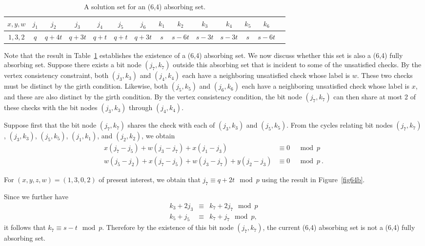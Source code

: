 \hspace{-0.2in}\small{\hspace{-0.2in}\begin{table}[ht]\vspace{-0.05in}\hspace{-0.2in}
\begin{tabular}{|c |c|c|c|c|c|c|c|c|c|c|c|c|c|}
  \hline
  $x,y,w$ & $j_1$ & $j_2$ & $j_3$ & $j_4$ & $j_5$ & $j_6$ & $k_1$ & $k_2$ & $k_3$ & $k_4$ & $k_5$ & $k_6$ \\
  \hline
$1,3,2$&  $q$ & $q+4t$ &  $q+3t$ &  $q+t$ &  $q+t$ & $q+3t$ & $s$ &
$s-6t$ & $s-3t$ & $s-3t$ & $s$ &
  $s-6t$\\
  \hline
\end{tabular}
\caption{ A solution set for an (6,4) absorbing
set.}\label{table64b}
\end{table}}
\normalsize

Note that the result in Table~\ref{table64b} establishes the
existence of a (6,4) absorbing set. We now discuss whether this
set is also a (6,4) fully absorbing set. Suppose there exists a
bit node $(j_7,k_7)$ outside this absorbing set that is incident
to some of the unsatisfied checks. By the vertex consistency
constraint, both $(j_3,k_3)$ and $(j_4,k_4)$ each have a
neighboring unsatisfied check whose label is $w$. These two checks
must be distinct by the girth condition. Likewise, both
$(j_5,k_5)$ and $(j_6,k_6)$ each have a neighboring unsatisfied
check whose label is $x$, and these are also distinct by the girth
condition. By the vertex consistency condition, the bit node
$(j_7,k_7)$ can then share at most 2 of these checks with the bit
nodes $(j_3,k_3)$ through $(j_4,k_4)$.

Suppose first that the bit node $(j_7,k_7)$ shares the check with
each of $(j_3,k_3)$ and $(j_5,k_5)$. From the cycles relating bit
nodes $(j_7,k_7)$, $(j_3,k_3)$, $(j_5,k_5)$, $(j_1,k_1)$, and
$(j_2,k_2)$, we obtain
\begin{eqnarray*}
x(j_7-j_5)+w(j_3-j_7)+x(j_1-j_3) &\equiv 0& \mod p\\
w(j_5-j_2)+x(j_7-j_5)+w(j_3-j_7)+y(j_2-j_3) &\equiv 0& \mod p~.
\end{eqnarray*}

For $(x,y,z,w)=(1,3,0,2)$ of present interest, we obtain that $j_7
\equiv q+2t \mod p$ using the result in Figure~\ref{fig64b}.

Since we further have
\begin{eqnarray*}
k_3+2j_3 &\equiv & k_7+2j_7 \mod p\\
k_5+j_5 & \equiv & k_7 +j_7 \mod p,
\end{eqnarray*}
it follows that $k_7 \equiv s-t \mod p$. Therefore by the existence
of this bit node $(j_7,k_7)$, the current (6,4) absorbing set is not
a (6,4) fully absorbing set.

